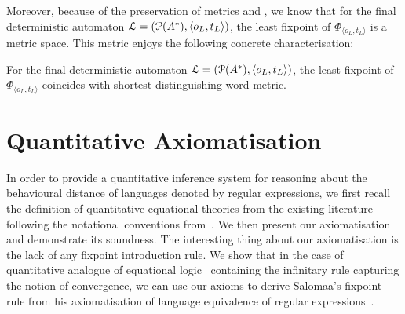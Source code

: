 Moreover, because of the preservation of metrics and , we know that for the final deterministic automaton $\mathcal{L} = (\mathcal{P} ({A}^\ast), \langle o_L, t_L\rangle)$, the least fixpoint of $\Phi_{\langle o_L, t_L\rangle}$ is a metric space. This metric enjoys the following concrete characterisation:
\begin{proposition}
	For the final deterministic automaton $\mathcal{L} = (\mathcal{P} ({A}^\ast), \langle o_L, t_L\rangle)$, the least fixpoint of $\Phi_{\langle o_L, t_L\rangle}$ coincides with shortest-distinguishing-word metric.
\end{proposition}

\section{Quantitative Axiomatisation}\label{c2:sec:quantitative_axiomatisation}
In order to provide a quantitative inference system for reasoning about the behavioural distance of languages denoted by regular expressions, we first recall the definition of quantitative equational theories from the existing literature~\cite{Mardare:2016:Quantitative,Bacci:2018:Bisimilarity} following the notational conventions from~\cite{Bacci:2018:Bisimilarity}. We then present our axiomatisation and demonstrate its soundness. The interesting thing about our axiomatisation is the lack of any fixpoint introduction rule. We show that in the case of quantitative analogue of equational logic~\cite{Mardare:2016:Quantitative} containing the infinitary rule capturing the notion of convergence, we can use our axioms to derive Salomaa's fixpoint rule from his axiomatisation of language equivalence of regular expressions~\cite{Salomaa:1966:Two}.

